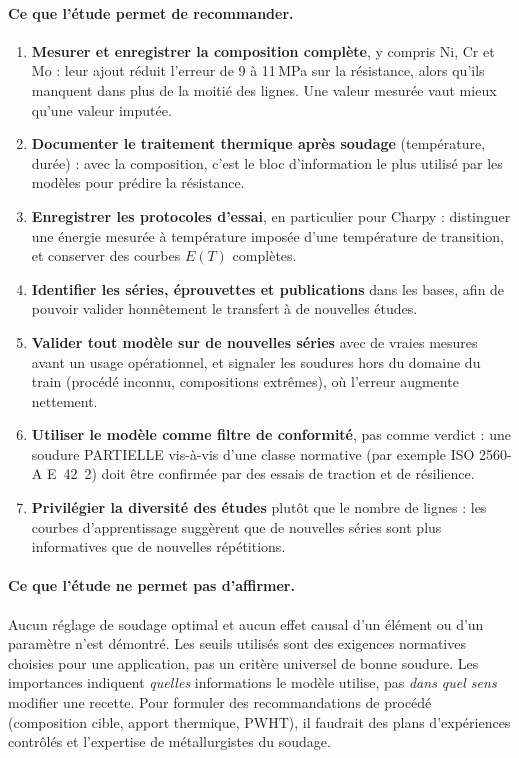 \paragraph{Ce que l'étude permet de recommander.}
\begin{enumerate}
  \item \textbf{Mesurer et enregistrer la composition complète}, y compris Ni, Cr et Mo : leur ajout réduit l'erreur de 9 à 11\,MPa sur la résistance, alors qu'ils manquent dans plus de la moitié des lignes. Une valeur mesurée vaut mieux qu'une valeur imputée.
  \item \textbf{Documenter le traitement thermique après soudage} (température, durée) : avec la composition, c'est le bloc d'information le plus utilisé par les modèles pour prédire la résistance.
  \item \textbf{Enregistrer les protocoles d'essai}, en particulier pour Charpy : distinguer une énergie mesurée à température imposée d'une température de transition, et conserver des courbes $E(T)$ complètes.
  \item \textbf{Identifier les séries, éprouvettes et publications} dans les bases, afin de pouvoir valider honnêtement le transfert à de nouvelles études.
  \item \textbf{Valider tout modèle sur de nouvelles séries} avec de vraies mesures avant un usage opérationnel, et signaler les soudures hors du domaine du train (procédé inconnu, compositions extrêmes), où l'erreur augmente nettement.
  \item \textbf{Utiliser le modèle comme filtre de conformité}, pas comme verdict : une soudure PARTIELLE vis-à-vis d'une classe normative (par exemple ISO 2560-A E~42~2) doit être confirmée par des essais de traction et de résilience.
  \item \textbf{Privilégier la diversité des études} plutôt que le nombre de lignes : les courbes d'apprentissage suggèrent que de nouvelles séries sont plus informatives que de nouvelles répétitions.
\end{enumerate}

\paragraph{Ce que l'étude ne permet pas d'affirmer.} Aucun réglage de soudage
\og optimal \fg{} et aucun effet causal d'un élément ou d'un paramètre n'est
démontré. Les seuils utilisés sont des exigences normatives choisies pour une
application, pas un critère universel de bonne soudure. Les importances indiquent
\emph{quelles} informations le modèle utilise, pas \emph{dans quel sens} modifier
une recette. Pour formuler des recommandations de procédé (composition cible,
apport thermique, PWHT), il faudrait des plans d'expériences contrôlés et
l'expertise de métallurgistes du soudage.

